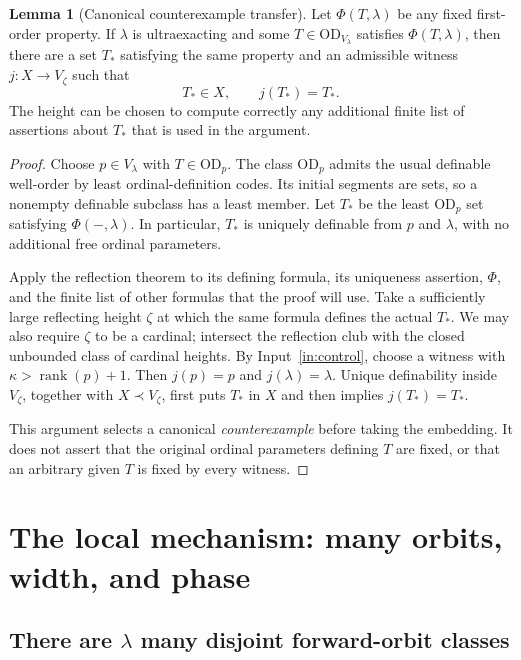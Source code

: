 \documentclass[11pt,letterpaper]{article}
\theoremstyle{definition}
\newtheorem{lemma}[definition]{Lemma}
\newcommand{\OD}{\mathrm{OD}}
\newcommand{\rank}{\operatorname{rank}}
\numberwithin{equation}{section}
\begin{document}
\begin{lemma}[Canonical counterexample transfer]\label{lem:canonical}
Let $\Phi(T,\lambda)$ be any fixed first-order property. If $\lambda$ is ultraexacting and some $T\in\OD_{V_\lambda}$ satisfies $\Phi(T,\lambda)$, then there are a set $T_*$ satisfying the same property and an admissible witness $j:X\to V_\zeta$ such that
\[
T_*\in X,\qquad j(T_*)=T_*.
\]
The height can be chosen to compute correctly any additional finite list of assertions about $T_*$ that is used in the argument.
\end{lemma}
\begin{proof}
Choose $p\in V_\lambda$ with $T\in\OD_p$. The class $\OD_p$ admits the usual definable well-order by least ordinal-definition codes. Its initial segments are sets, so a nonempty definable subclass has a least member. Let $T_*$ be the least $\OD_p$ set satisfying $\Phi(-,\lambda)$. In particular, $T_*$ is uniquely definable from $p$ and $\lambda$, with no additional free ordinal parameters.

Apply the reflection theorem to its defining formula, its uniqueness assertion, $\Phi$, and the finite list of other formulas that the proof will use. Take a sufficiently large reflecting height $\zeta$ at which the same formula defines the actual $T_*$. We may also require $\zeta$ to be a cardinal; intersect the reflection club with the closed unbounded class of cardinal heights. By Input~\ref{in:control}, choose a witness with $\kappa>\rank(p)+1$. Then $j(p)=p$ and $j(\lambda)=\lambda$. Unique definability inside $V_\zeta$, together with $X\prec V_\zeta$, first puts $T_*$ in $X$ and then implies $j(T_*)=T_*$.

This argument selects a canonical \emph{counterexample} before taking the embedding. It does not assert that the original ordinal parameters defining $T$ are fixed, or that an arbitrary given $T$ is fixed by every witness.
\end{proof}

\section{The local mechanism: many orbits, width, and phase}\label{sec:local}

\subsection{There are $\lambda$ many disjoint forward-orbit classes}
\end{document}
